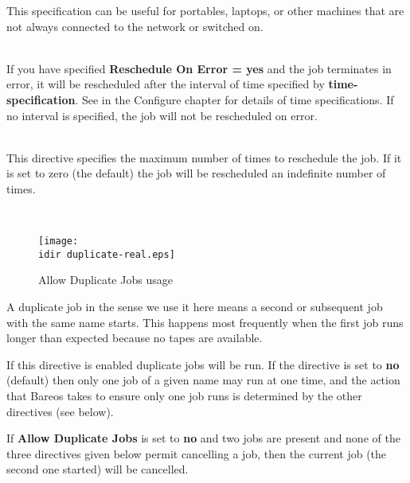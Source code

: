 \begin{description}
This specification can be useful for portables, laptops, or other
machines that are not always connected to the network or switched on.

\item [Reschedule Interval = {\textless}time-specification{\textgreater}] \hfill \\
If you have specified {\bf Reschedule On Error = yes} and the job
terminates in error, it will be rescheduled after the interval of time
specified by {\bf time-specification}.  See  in the Configure chapter for details of
time specifications.  If no interval is specified, the job will not be
rescheduled on error.

\item [Reschedule Times = {\textless}count{\textgreater}] \hfill \\
This directive specifies the maximum number of times to reschedule the
job.  If it is set to zero (the default) the job will be rescheduled an
indefinite number of times.

\item [Allow Duplicate Jobs = {\textless}yes{\textbar}no{\textgreater}] \hfill \\
\begin{figure}[htbp]
  \centering
  \texttt{[image: \\idir duplicate-real.eps]}
  \caption{Allow Duplicate Jobs usage}
  \label{fig:allowduplicatejobs}
\end{figure}
A duplicate job in the sense we use it here means a second or subsequent job
with the same name starts.  This happens most frequently when the first job
runs longer than expected because no tapes are available.

If this directive is enabled duplicate jobs will be run.  If
the directive is set to {\bf no} (default) then only one job of a given name
may run at one time, and the action that Bareos takes to ensure only
one job runs is determined by the other directives (see below).

If {\bf Allow Duplicate Jobs} is set to {\bf no} and two jobs
are present and none of the three directives given below permit
cancelling a job, then the current job (the second one started)
will be cancelled.



\end{description}
